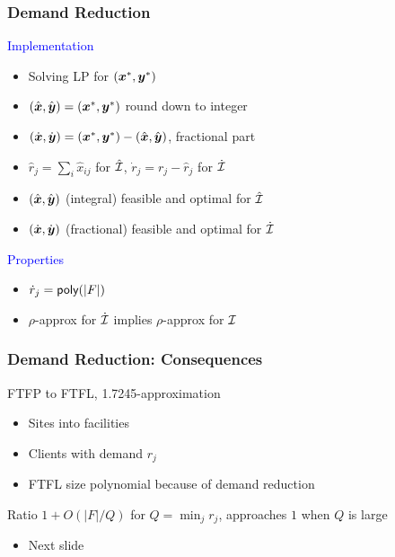 \documentclass[hyperref,dvipsnames,svgnames,compress]{beamer}
\begin{document}
\begin{frame}
  \frametitle{Demand Reduction}

  \large{\textcolor{blue}{Implementation}}

  \begin{itemize}
  \item Solving LP for $(\boldsymbol{x}^\ast, \boldsymbol{y}^\ast)$
  \item $(\hat{\boldsymbol{x}}, \hat{\boldsymbol{y}}) = (\boldsymbol{x}^\ast, \boldsymbol{y}^\ast)$ round down to integer
  \item $(\dot{\boldsymbol{x}}, \dot{\boldsymbol{y}}) = (\boldsymbol{x}^\ast, \boldsymbol{y}^\ast) - (\hat{\boldsymbol{x}}, \hat{\boldsymbol{y}})$, fractional part
  \item $\hat r_j = \sum_{i}\hat x_{ij}$ for $\hat{\mathcal{I}}$, $\dot r_j = r_j - \hat r_j$ for $\dot{\mathcal{I}}$
  \item $(\hat{\boldsymbol{x}}, \hat{\boldsymbol{y}})$ (integral) feasible and optimal for $\hat{\mathcal{I}}$
  \item $(\dot{\boldsymbol{x}}, \dot{\boldsymbol{y}})$ (fractional) feasible and optimal for $\dot{\mathcal{I}}$
  \end{itemize}
  
  \large{\textcolor{blue}{Properties}}

  \begin{itemize}
  \item ${\dot r}_j = {\mbox{\sf poly}}(|F|)$
  \item $\rho$-approx for $\dot {\mathcal{I}}$ implies $\rho$-approx for $\mathcal{I}$
  \end{itemize}
\end{frame}

\begin{frame}
  \frametitle{Demand Reduction: Consequences}
  \begin{block}{}
    FTFP to FTFL, 1.7245-approximation    
  \end{block}
  \begin{itemize}
  \item Sites into facilities
  \item Clients with demand $r_j$
  \item FTFL size polynomial because of demand reduction
  \end{itemize}

  \begin{block}{}
    Ratio $1 + O(|F| / Q)$ for $Q = \min_j r_j$,
    approaches $1$ when $Q$ is large
  \end{block}
  \begin{itemize}
  \item Next slide
  \end{itemize}
\end{frame}
\end{document}
